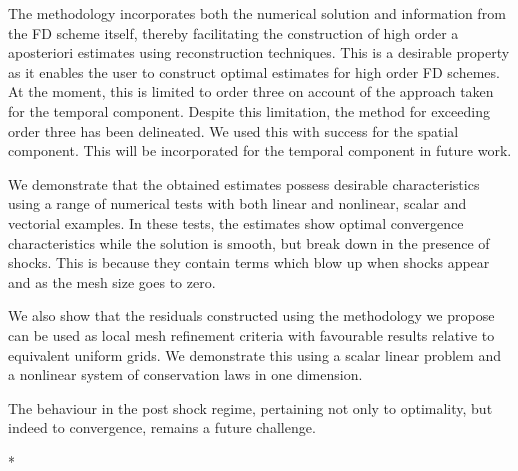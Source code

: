 \documentclass[final]{amsart}
\numberwithin{equation}{section}
\begin{document}
The methodology incorporates both the numerical solution and information from the FD scheme itself, thereby facilitating the construction of high order a aposteriori estimates using reconstruction techniques. This is  a desirable property as it enables the user to construct optimal estimates for high order FD schemes.  
At the moment, this is limited to order three on account of the approach taken for the temporal component. Despite this limitation, the method for exceeding order three has been delineated.  We used this with success for the spatial component.  This will be incorporated for the temporal component  in future work.



We demonstrate that the  obtained estimates possess desirable characteristics using a range of numerical tests with both linear and nonlinear, scalar and vectorial examples.  In these tests, the estimates show optimal convergence characteristics while the solution is smooth, but break down in the presence of shocks.  This is because they contain terms which blow up when shocks appear and as the mesh size goes to zero.

We also show that the residuals constructed using the methodology we propose can be used as local mesh refinement criteria with favourable results relative to equivalent uniform grids.  We demonstrate this using a scalar linear problem and a nonlinear system of conservation laws in one dimension.

The behaviour in the post shock regime, pertaining not only to optimality, but indeed to convergence, remains a future challenge.


 
  \/*
\end{document}
